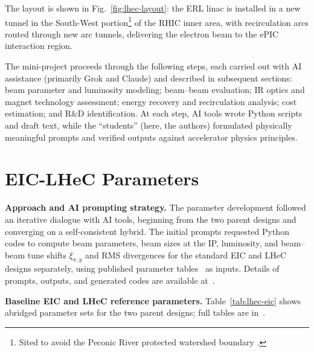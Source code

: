 \documentclass[%
               refpage       %
               hyphens,      %
               ]{jacow}
\begin{document}
The layout is shown in Fig.~\ref{fig:lhec-layout}: the ERL linac is 
installed in a new tunnel in the South-West portion\footnote{Sited to 
avoid the Peconic River protected watershed boundary \cite{peconic-river}.} of the RHIC 
inner area, with recirculation arcs routed through new  arc tunnels, 
delivering the electron beam to the ePIC interaction region.

The mini-project proceeds through the following steps, each carried out 
with AI assistance (primarily Grok and Claude) and described in subsequent 
sections: beam parameter and luminosity modeling; beam--beam evaluation; 
IR optics and magnet technology assessment; energy recovery and 
recirculation analysis; cost estimation; and R\&D identification. 
At each step, AI tools wrote Python scripts and draft text, while the 
``students'' (here, the authors) formulated physically meaningful prompts 
and verified outputs against accelerator physics principles.





\section{EIC-LHeC Parameters}

\textbf{Approach and AI prompting strategy.}
The parameter development followed an iterative dialogue with AI tools, 
beginning from the two parent designs and converging on a self-consistent 
hybrid. The initial prompts requested Python codes to compute beam parameters, 
beam sizes at the IP, luminosity, and beam--beam tune shifts $\xi_{x,y}$ and 
RMS divergences for the standard EIC and LHeC designs separately, using 
published parameter tables~\cite{EIC-pars,ESPP-LHeC} as inputs. Details of 
prompts, outputs, and generated codes are available at~\cite{GitHub}.

\textbf{Baseline EIC and LHeC reference parameters.}
Table~\ref{tab:lhec-eic} shows abridged parameter sets for the two parent 
designs; full tables are in~\cite{EIC-pars,ESPP-LHeC}.

\end{document}
